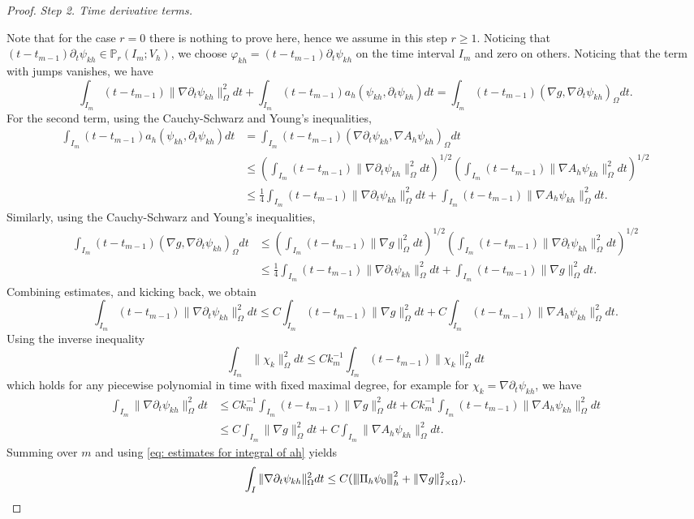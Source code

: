 \documentclass{m2an}
\newcommand{\1}{\mathds{1}}
\newcommand{\Om}{\Omega}
\newcommand{\na}{\nabla}
\newcommand{\vertiii}[1]{{\left\vert\kern-0.25ex\left\vert\kern-0.25ex\left\vert #1
    \right\vert\kern-0.25ex\right\vert\kern-0.25ex\right\vert}}
\theoremstyle{definition}
\begin{document}
\begin{proof}
{\it Step 2. Time derivative terms.}

Note that for the case $r=0$ there is nothing to prove here, hence we assume in this step $r\ge 1$.
Noticing that $(t-t_{m-1})\partial_t \psi_{kh}\in \mathbb{P}_r(I_m;V_h)$, we  choose $\varphi_{kh}=(t-t_{m-1})\partial_t \psi_{kh}$ on the time interval $I_m$ and zero on others. Noticing that the term with jumps vanishes, we have
$$
\int_{I_m}(t-t_{m-1})\|\na \partial_t\psi_{kh}\|^2_\Omega dt+\int_{I_m}(t-t_{m-1})a_h(\psi_{kh},\partial_t \psi_{kh})dt =\int_{I_m}(t-t_{m-1})(\na g,\na \partial_t\psi_{kh})_\Omega dt.
$$
For the second term, using the Cauchy-Schwarz and Young's inequalities,
$$
\begin{aligned}
\int_{I_m}(t-t_{m-1})a_h(\psi_{kh},\partial_t \psi_{kh})dt&=\int_{I_m}(t-t_{m-1})( \na \partial_t\psi_{kh},\na A_h \psi_{kh})_\Omega dt\\
&\le \left(\int_{I_m}(t-t_{m-1})\| \na\partial_t \psi_{kh}\|_\Om^2dt\right)^{1/2}\left(\int_{I_m}(t-t_{m-1})\| \na A_h\psi_{kh}\|_\Om^2dt\right)^{1/2}\\
&\le \frac{1}{4}\int_{I_m}(t-t_{m-1})\| \na \partial_t \psi_{kh}\|_\Om^2dt+\int_{I_m}(t-t_{m-1})\| \na A_h\psi_{kh}\|_\Om^2dt.
\end{aligned}
$$
Similarly, 
using the Cauchy-Schwarz and Young's inequalities,
$$
\begin{aligned}
\int_{I_m}(t-t_{m-1})(\na g,\na\partial_t \psi_{kh})_\Omega dt&\le \left(\int_{I_m}(t-t_{m-1})\|\na g\|^2_\Omega dt\right)^{1/2}\left(\int_{I_m}(t-t_{m-1})\|\na \partial_t\psi_{kh}\|^2_\Omega dt\right)^{1/2}\\
&\le \frac{1}{4}\int_{I_m}(t-t_{m-1})\| \na\partial_t \psi_{kh}\|_\Om^2dt+\int_{I_m}(t-t_{m-1})\| \na g\|^2_\Om dt.
\end{aligned}
$$
Combining estimates, and kicking back, we obtain
$$
\int_{I_m}(t-t_{m-1})\|\na \partial_t\psi_{kh}\|^2_\Omega dt\le C\int_{I_m}(t-t_{m-1})\|\na g\|^2_\Omega dt+C\int_{I_m}(t-t_{m-1})\| \na A_h\psi_{kh}\|^2_\Om dt.
$$
Using the inverse inequality
$$
 \int_{I_m}\|\chi_{k}\|^2_\Omega dt\le Ck_{m}^{-1}\int_{I_m}(t-t_{m-1})\|\chi_{k}\|^2_\Omega dt
$$
which holds for any piecewise polynomial in time with fixed maximal degree,
for example for $\chi_k=\na\partial_t \psi_{kh}$, we have
$$
\begin{aligned}
\int_{I_m}\|\na \partial_t\psi_{kh}\|^2_\Omega dt&\le  Ck_{m}^{-1}\int_{I_m}(t-t_{m-1})\|\na g\|^2_\Omega dt+Ck_{m}^{-1}\int_{I_m}(t-t_{m-1})\| \na A_h\psi_{kh}\|_\Om^2dt\\
&\le  C\int_{I_m}\|\na g\|^2_\Omega dt+C\int_{I_m}\| \na A_h\psi_{kh}\|_\Om^2dt.
\end{aligned}
$$
Summing over $m$ and using \eqref{eq: estimates for integral of ah} yields
\begin{equation}\label{eq: estimates for integral of pa_tvkh}
  \int_{I}\|\na \partial_t\psi_{kh}\|^2_\Omega dt\le C(\vertiii{\Pi_h \psi_0}^2_h + \|\na g\|^2_{I\times \Om}).
\end{equation}


\end{proof}
\end{document}
